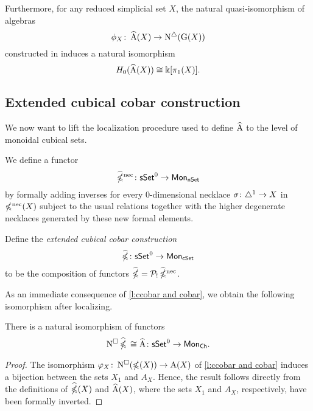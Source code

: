 Furthermore, for any reduced simplicial set $X$, the natural quasi-isomorphism of algebras
\[
\phi_X \colon \operatorname{\widehat{A}}(X) \to \operatorname{N^{\triangle}}(\operatorname{G}(X))
\]
constructed in \cite{hess2010cobar} induces a natural isomorphism
\[
H_0(\operatorname{\widehat{A}}(X)) \cong \Bbbk[\pi_1(X)].
\]

\subsection{Extended cubical cobar construction} \label{ss:extended cubical cobar}

We now want to lift the localization procedure used to define $\operatorname{\widehat{A}}$ to the level of monoidal cubical sets.

We define a functor
\[
\operatorname{\widehat{\mathbb{\Omega}}^{\mathrm{nec}}} \colon \mathsf{sSet}^0 \to \mathsf{Mon}_{\mathsf{nSet}}
\]
by formally adding inverses for every $0$-dimensional necklace $\sigma \colon \triangle^1 \to X$ in $\operatorname{\mathbb{\Omega}^{\mathrm{nec}}}(X)$ subject to the usual relations together with the higher degenerate necklaces generated by these new formal elements.

Define the \textit{extended cubical cobar construction}
\[
\operatorname{\widehat{\mathbb{\Omega}}} \colon \mathsf{sSet}^0 \to \mathsf{Mon}_{\mathsf{cSet}}
\]
to be the composition of functors $\operatorname{\widehat{\mathbb{\Omega}}} = \mathcal{P}_{!} \operatorname{\widehat{\mathbb{\Omega}}^{\mathrm{nec}}}$.

As an immediate consequence of \cref{l:ccobar and cobar}, we obtain the following isomorphism after localizing.

\begin{corollary}
	There is a natural isomorphism of functors
	\[
	\operatorname{N^{\square}} \operatorname{\widehat{\mathbb{\Omega}}} \, \cong \operatorname{\widehat{A}} \colon \mathsf{sSet}^0 \to \mathsf{Mon}_{\mathsf{Ch}}.
	\]
\end{corollary}

\begin{proof}
	The isomorphism $\varphi_X \colon \operatorname{N^{\square}}(\operatorname{\mathbb{\Omega}}(X))\to \operatorname{A}(X)$
	of \cref{l:ccobar and cobar} induces a bijection between the sets
	$X_1$ and $A_X$.
	Hence, the result follows directly from the definitions of $\operatorname{\widehat{\mathbb{\Omega}}}(X)$ and $\operatorname{\widehat{A}}(X)$, where the sets $X_1$ and $A_X$, respectively, have been formally inverted.
\end{proof}